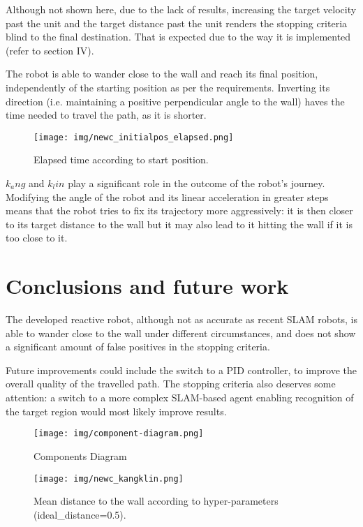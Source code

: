 \documentclass[conference]{IEEEtran}
\begin{document}
Although not shown here, due to the lack of results, increasing the target velocity past the unit and the target distance past the unit renders the stopping criteria blind to the final destination. That is expected due to the way it is implemented (refer to section IV).

The robot is able to wander close to the wall and reach its final position, independently of the starting position as per the requirements. Inverting its direction (i.e. maintaining a positive perpendicular angle to the wall) haves the time needed to travel the path, as it is shorter.

\begin{figure}
    \centering
    \texttt{[image: img/newc\_initialpos\_elapsed.png]}
    \caption{Elapsed time according to start position.}
    \label{fig:elapsed_initialpos}
\end{figure}

\(k_ang\) and \(k_lin\) play a significant role in the outcome of the robot's journey. Modifying the angle of the robot and its linear acceleration in greater steps means that the robot tries to fix its trajectory more aggressively: it is then closer to its target distance to the wall but it may also lead to it hitting the wall if it is too close to it.

\section{Conclusions and future work} \label{conclusion}

The developed reactive robot, although not as accurate as recent SLAM robots, is able to wander close to the wall under different circumstances, and does not show a significant amount of false positives in the stopping criteria.

Future improvements could include the switch to a PID controller, to improve the overall quality of the travelled path. The stopping criteria also deserves some attention: a switch to a more complex SLAM-based agent enabling recognition of the target region would most likely improve results.


\pagebreak




\newpage
\appendix

\begin{figure}[h]
    \centering
    \texttt{[image: img/component-diagram.png]}
    \caption{Components Diagram}
    \label{fig:components-diagram}
\end{figure}

\begin{figure}[h]
    \centering
    \texttt{[image: img/newc\_kangklin.png]}
    \label{fig:mean_distance_kang_klin_newc}
    \caption{Mean distance to the wall according to hyper-parameters (ideal\_distance=0.5).}
\end{figure}
\end{document}
